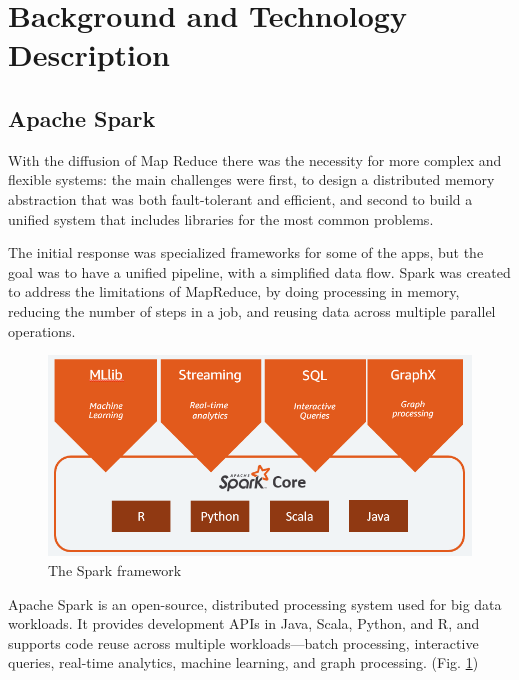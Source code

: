\documentclass[a4paper,11pt, twoside]{article}
\begin{document}
    \section{Background and Technology Description}\label{backg}
        \subsection{Apache Spark}
            With the diffusion of Map Reduce there was the necessity for more complex and flexible systems: the main challenges were first, to design a distributed memory abstraction that was both fault-tolerant and efficient, and second to build a unified system that includes libraries for the most common problems. 
            
            The initial response was specialized frameworks for some of the apps, but the goal was to have a unified pipeline, with a simplified data flow. Spark was created to address the limitations of MapReduce, by doing processing in memory, reducing the number of steps in a job, and reusing data across multiple parallel operations.
    
            \begin{figure}
                \centering
                \includegraphics[scale=0.5]{spark.png}
                \caption{The Spark framework }
                \label{fig:framework}
            \end{figure}
    
            \bigskip
    
            \noindent   
            Apache Spark is an open-source, distributed processing system used for big data workloads. It provides development APIs in Java, Scala, Python, and R, and supports code reuse across multiple workloads—batch processing, interactive queries, real-time analytics, machine learning, and graph processing. (Fig. \ref{fig:framework}) \cite{apache}
            
\end{document}
